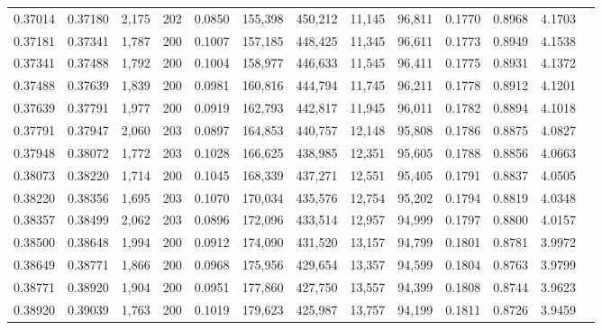 \begin{tabular}{rrrrrrrrrrrrr}
0.37014 & 0.37180 & 2,175 & 202 &                                     0.0850 & 155,398 & 450,212 &  11,145 &  96,811 & 0.1770 & 0.8968 & 4.1703 \\
0.37181 & 0.37341 & 1,787 & 200 &                                     0.1007 & 157,185 & 448,425 &  11,345 &  96,611 & 0.1773 & 0.8949 & 4.1538 \\
0.37341 & 0.37488 & 1,792 & 200 &                                     0.1004 & 158,977 & 446,633 &  11,545 &  96,411 & 0.1775 & 0.8931 & 4.1372 \\
0.37488 & 0.37639 & 1,839 & 200 &                                     0.0981 & 160,816 & 444,794 &  11,745 &  96,211 & 0.1778 & 0.8912 & 4.1201 \\
0.37639 & 0.37791 & 1,977 & 200 &                                     0.0919 & 162,793 & 442,817 &  11,945 &  96,011 & 0.1782 & 0.8894 & 4.1018 \\
0.37791 & 0.37947 & 2,060 & 203 &                                     0.0897 & 164,853 & 440,757 &  12,148 &  95,808 & 0.1786 & 0.8875 & 4.0827 \\
0.37948 & 0.38072 & 1,772 & 203 &                                     0.1028 & 166,625 & 438,985 &  12,351 &  95,605 & 0.1788 & 0.8856 & 4.0663 \\
0.38073 & 0.38220 & 1,714 & 200 &                                     0.1045 & 168,339 & 437,271 &  12,551 &  95,405 & 0.1791 & 0.8837 & 4.0505 \\
0.38220 & 0.38356 & 1,695 & 203 &                                     0.1070 & 170,034 & 435,576 &  12,754 &  95,202 & 0.1794 & 0.8819 & 4.0348 \\
0.38357 & 0.38499 & 2,062 & 203 &                                     0.0896 & 172,096 & 433,514 &  12,957 &  94,999 & 0.1797 & 0.8800 & 4.0157 \\
0.38500 & 0.38648 & 1,994 & 200 &                                     0.0912 & 174,090 & 431,520 &  13,157 &  94,799 & 0.1801 & 0.8781 & 3.9972 \\
0.38649 & 0.38771 & 1,866 & 200 &                                     0.0968 & 175,956 & 429,654 &  13,357 &  94,599 & 0.1804 & 0.8763 & 3.9799 \\
0.38771 & 0.38920 & 1,904 & 200 &                                     0.0951 & 177,860 & 427,750 &  13,557 &  94,399 & 0.1808 & 0.8744 & 3.9623 \\
0.38920 & 0.39039 & 1,763 & 200 &                                     0.1019 & 179,623 & 425,987 &  13,757 &  94,199 & 0.1811 & 0.8726 & 3.9459 \\

\end{tabular}
